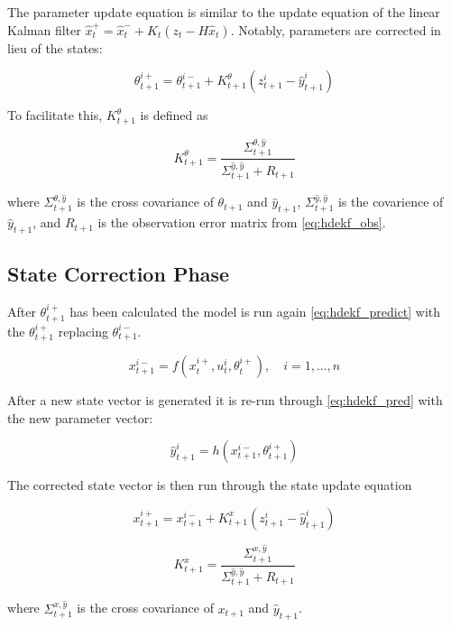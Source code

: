 The parameter update equation is similar to the update equation of the linear Kalman filter $\hat{x}^{+}_{t} = \hat{x}^{-}_{t} + K_{t}(z_{t}-H\hat{x}_{t})$. Notably,  parameters are corrected in lieu of the states:

\begin{equation}\label{eq:hdekf_param_update}
\theta_{t+1}^{i+} = \theta_{t+1}^{i-} + K_{t+1}^{\theta}(z_{t+1}^{i}-\hat{y}_{t+1}^{i})
\end{equation}

To facilitate this, $K_{t+1}^{\theta}$ is defined as

\begin{equation}\label{eq:hdekf_param_k}
K_{t+1}^{\theta} = \frac{\Sigma^{\theta,\hat{y}}_{t+1}}{\Sigma^{\hat{y},\hat{y}}_{t+1} + R_{t+1}}
\end{equation}

where $\Sigma^{\theta,\hat{y}}_{t+1}$ is the cross covariance of $\theta_{t+1}$ and $\hat{y}_{t+1}$, $\Sigma^{\hat{y},\hat{y}}_{t+1}$ is the covarience of $\hat{y}_{t+1}$, and $R_{t+1}$ is the observation error matrix from \eqref{eq:hdekf_obs}. 

\subsection{State Correction Phase}

After $\theta_{t+1}^{i+}$ has been calculated the model is run again \eqref{eq:hdekf_predict} with the $\theta_{t+1}^{i+}$ replacing $\theta_{t+1}^{i-}$.

\begin{equation}\label{eq:hdekf_predict_2}
x_{t+1}^{i-} = f(x_{t}^{i+}, u_{t}^{i}, \theta^{i+}_{t}), \quad i=1,...,n
\end{equation}

After a new state vector is generated it is re-run through \eqref{eq:hdekf_pred} with the new parameter vector:

\begin{equation}\label{eq:hdekf_pred_2}
\hat{y}_{t+1}^{i} = h(x_{t+1}^{i-}, \theta_{t+1}^{i+})
\end{equation}

The corrected state vector is then run through the state update equation

\begin{equation}\label{eq:hdekf_state_update}
x_{t+1}^{i+} = x_{t+1}^{i-} + K_{t+1}^{x}(z_{t+1}^{i}-\hat{y}_{t+1}^{i})
\end{equation}
 
\begin{equation}\label{eq:hdekf_param_k}
K_{t+1}^{x} = \frac{\Sigma^{x,\hat{y}}_{t+1}}{\Sigma^{\hat{y},\hat{y}}_{t+1} + R_{t+1}}
\end{equation}

where $\Sigma^{x,\hat{y}}_{t+1}$ is the cross covariance of $x_{t+1}$ and $\hat{y}_{t+1}$.



